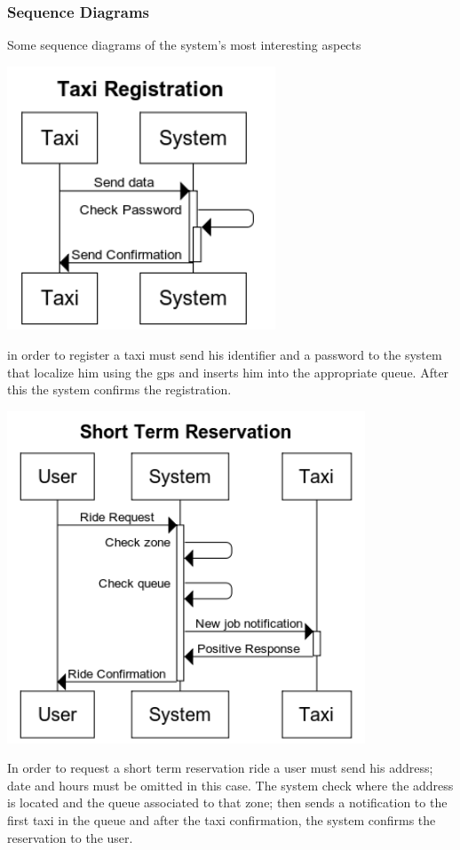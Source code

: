 \subsubsection{Sequence Diagrams}
	Some sequence diagrams of the system's most interesting aspects
	\begin{center}
		\includegraphics[width=0.60\textwidth]{./images/Taxi_Registration}
	\end{center}
	in order to register a taxi must send his identifier and a password to the system that localize him using the gps and inserts him into the appropriate queue. After this the system confirms the registration.
		\newpage
	\begin{center}
		\includegraphics[width=0.80\textwidth]{./images/Short_Term_Reservation}
	\end{center}
	In order to request a short term reservation ride a user must send his address; date and hours must be omitted in this case. The system check where the address is located and the queue associated to that zone; then sends a notification to the first taxi in the queue and after the taxi confirmation, the system confirms the reservation to the user.
